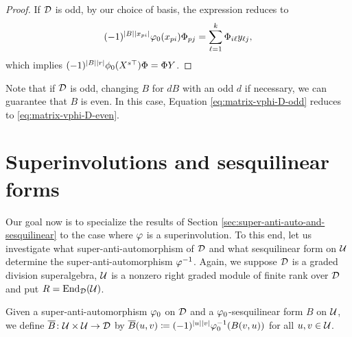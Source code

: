 \documentclass{amsbook}
\begin{document}
\begin{proof}
    
    If $\mathcal{D}$ is odd, by our choice of basis, the expression reduces to
    \[
        (-1)^{|B| |x_{pi}|} \varphi_0(x_{pi}) \Phi_{pj} =  \sum_{\ell=1}^k \Phi_{i \ell} y_{\ell j},
    \]
    which implies $(-1)^{|B||r|} \phi_0(X^{s\top}) \Phi = \Phi Y$.
\end{proof}

\begin{remark}
    Note that if $\mathcal{D}$ is odd, changing $B$ for $dB$ with an odd $d$ if necessary, we can guarantee that $B$ is even. 
    In this case, Equation \eqref{eq:matrix-vphi-D-odd} reduces to \eqref{eq:matrix-vphi-D-even}.
\end{remark}


\section{Superinvolutions and sesquilinear forms}

Our goal now is to specialize the results of Section \ref{sec:super-anti-auto-and-sesquilinear} to the case where $\varphi$ is a superinvolution. 
To this end, let us investigate what super-anti-automorphism of $\mathcal{D}$ and what sesquilinear form on $\mathcal U$ determine the super-anti-automorphism $\varphi^{-1}$. 
Again, we suppose $\mathcal{D}$ is a graded division superalgebra, $\mathcal U$ is a nonzero right graded module of finite rank over $\mathcal{D}$ and put $R = \operatorname{End}_{\mathcal{D}} (\mathcal U)$.

\begin{defi}\label{def:barB}
    Given a super-anti-automorphism $\varphi_0$ on $\mathcal{D}$ and a $\varphi_0$-sesqui\-li\-near form $B$ on $\mathcal U$,  we define $\overline {B}\colon \mathcal U\times \mathcal U \to \mathcal{D}$ by $\overline {B} (u,v) \coloneqq (-1)^{|u||v|} \varphi_0^{-1} (B(v, u))$ for all $u, v \in \mathcal U$.
\end{defi}

\end{document}
